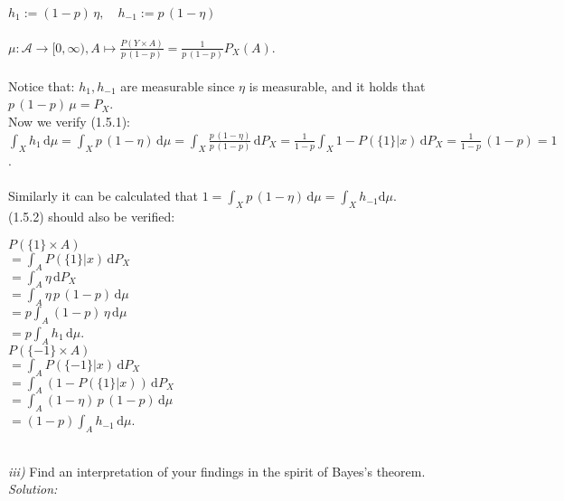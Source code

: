 \documentclass{article}
\begin{document}
\indent $h_1 := (1-p)\, \eta, \quad h_{-1}:= p\, (1-\eta) \quad $\\
\vspace*{-1em} \\
\indent $\mu : \mathcal{A} \rightarrow [0,\infty) , A \mapsto \displaystyle{ \frac{P(Y\times A)}{p\, (1-p)} = \frac{1}{p\, (1-p)} P_X(A) }$.\\
\vspace*{-1.3em} \\
Notice that:  $h_1, h_{-1}$ are measurable since $\eta$ is measurable, and it holds that $p\, (1-p)\, \mu = P_X$. \\
Now we verify (1.5.1): \\
\indent $\displaystyle{ \int_X h_1 \, \text{d}\mu = \int_X p\, (1-\eta) \, \text{d}\mu = \int_X \frac{p\, (1-\eta)}{p\, (1-p)} \, \text{d}P_X = \frac{1}{1-p}\int_X 1-P(\{1\}|x)\, \text{d}P_X = \frac{1}{1-p} \,(1-p) = 1 }$.\\
\vspace*{-0.5em} \\
Similarly it can be calculated that $ \displaystyle{  1 = \int_X p\, (1-\eta)\,\text{d} \mu = \int_X h_{-1} \text{d} \mu }$.\vspace*{0.6em}\\
(1.5.2) should also be verified\vspace*{-0.3em}: 
\begin{multicols}{2}
\indent \indent \indent $ P( \{1\} \times A ) $ \vspace*{0.5em} \\
\indent \indent $= \displaystyle{ \int_A P(\{1\} | x )\, \text{d}  P_X }$\vspace*{0.5em}\\
\indent \indent $\displaystyle{= \int_A \eta \, \text{d} P_X }$\vspace*{0.5em}\\
\indent \indent $\displaystyle{= \int_A \eta\, p\, (1-p)\, \text{d} \mu }$\vspace*{0.5em}\\
\indent \indent $\displaystyle{= p\int_A (1-p)\, \eta \, \text{d} \mu }$\vspace*{0.5em}\\
\indent \indent $\displaystyle{= p \int_A h_1\, \text{d} \mu } $.\\
\indent \indent \indent  $ P( \{-1\} \times A ) $\vspace*{0.5em}\\
\indent \indent $= \displaystyle{ \int_A P(\{-1\} | x )\, \text{d}  P_X }$\vspace*{0.5em}\\
\indent \indent $= \displaystyle{ \int_A (1-P(\{1\} | x )  ) \, \text{d} P_X }$\vspace*{0.5em}\\
\indent \indent  $= \displaystyle{ \int_A (1- \eta)\, p\, (1-p)\, \text{d} \mu  } $\vspace*{0.5em}\\
\indent \indent $= \displaystyle{ (1-p)\int_A h_{-1} \, \text{d} \mu   }$.\\
\\
\end{multicols}
\textsl{iii)} Find an interpretation of your findings in the spirit of Bayes's theorem. \\
\textsl{Solution:} \\
\end{document}
